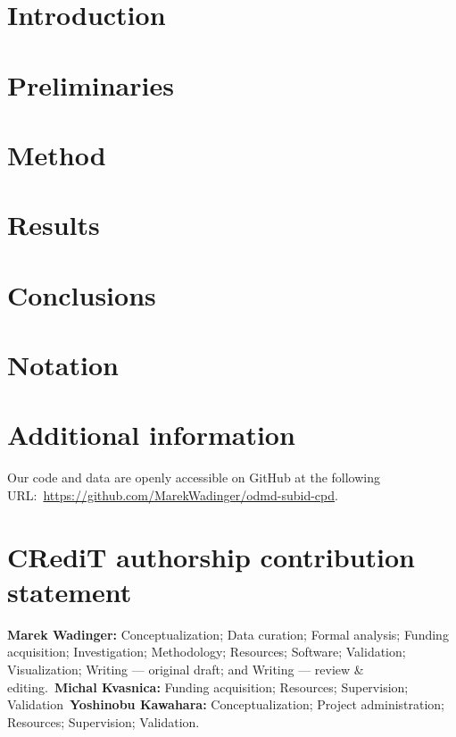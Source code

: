 \documentclass[preprint,12pt,authoryear]{elsarticle}
\begin{document}
\linenumbers{}

\section{Introduction}\label{sec:introduction}


\section{Preliminaries}\label{sec:preliminaries}


\clearpage
\section{Method}\label{sec:method}


\clearpage
\section{Results}\label{sec:results}


\section{Conclusions}\label{sec:conclusions}


\section*{Notation}


\section*{Additional information}
Our code and data are openly accessible on GitHub at the following URL:~\url{https://github.com/MarekWadinger/odmd-subid-cpd}.

\section*{CRediT authorship contribution statement}
\textbf{Marek Wadinger:} Conceptualization; Data curation; Formal analysis; Funding acquisition; Investigation; Methodology; Resources; Software; Validation; Visualization; Writing --- original draft; and Writing --- review \& editing.~\textbf{Michal Kvasnica:} Funding acquisition; Resources; Supervision; Validation~\textbf{Yoshinobu Kawahara:} Conceptualization; Project administration; Resources; Supervision; Validation.
\end{document}

